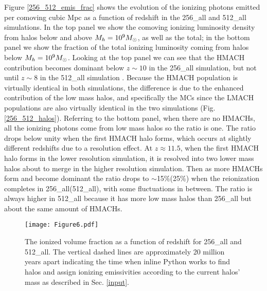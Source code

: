 \documentclass[iop,apj]{emulateapj}
\begin{document}
Figure \ref{256_512_emis_frac} shows the evolution of the ionizing photons emitted per comoving cubic Mpc as a function of redshift in the 256\_all and 512\_all simulations. In the top panel we show the comoving ionizing luminosity density from halos below and above $\mh = 10^9\Ms$, as well as the total; in the bottom panel we show the fraction of the total ionizing luminosity coming from halos below $\mh = 10^9\Ms$.  Looking at the top panel we can see that the HMACH contribution becomes dominant below $z \sim 10$ in the 256\_all simulation, but not until $z \sim 8$ in the 512\_all simulation . Because the HMACH population is virtually identical in both simulations, the difference is due to the enhanced contribution of the low mass halos, and specifically the MCs since the LMACH populations are also virtually identical in the two simulations (Fig. \ref{256_512_halos}).  Referring to the bottom panel, when there are no HMACHs, all the ionizing photons come from low mass halos so the ratio is one. The ratio drops below unity when the first HMACH halo forms, which occurs at slightly different redshifts due to a resolution effect. At $z \approx 11.5$, when the first HMACH halo forms in the lower resolution simulation, it is resolved into two lower mass halos about to merge in the higher resolution simulation. Then as more HMACHs form and become dominant the ratio drops to $\sim$15\%(25\%) when the reionization completes in 256\_all(512\_all), with some fluctuations in between. The ratio is always higher in 512\_all because it has more low mass halos than 256\_all but about the same amount of HMACHs.  

\begin{figure}
\texttt{[image: Figure6.pdf]}
\caption{The ionized volume fraction as a function of redshift for 256\_all and 512\_all. The vertical dashed lines are approximately 20 million years apart indicating the time when inline Python works to find halos and assign ionizing emissivities according to the current halos' mass as described in Sec. \ref{input}.}
\label{256_512_ion_frac10}
\end{figure}
\end{document}
